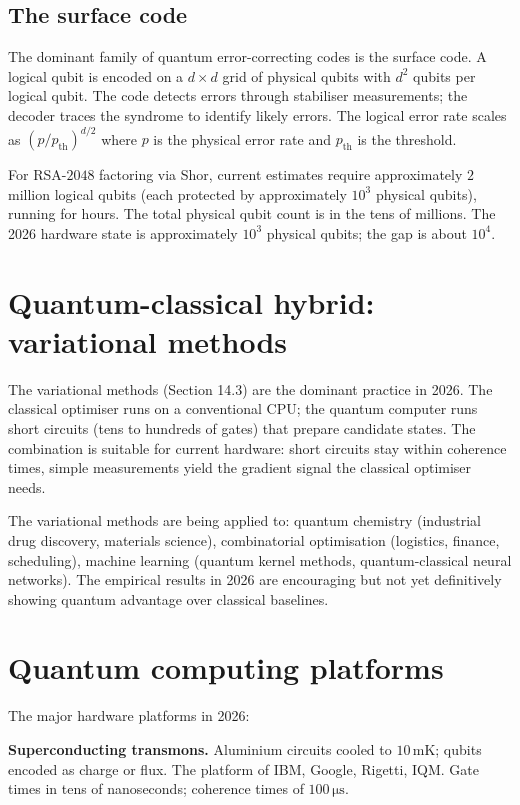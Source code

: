 \subsection{The surface code}

The dominant family of quantum error-correcting codes is the surface code. A logical qubit is encoded on a $d \times d$ grid of physical qubits with $d^2$ qubits per logical qubit. The code detects errors through stabiliser measurements; the decoder traces the syndrome to identify likely errors. The logical error rate scales as $(p/p_{\mathrm{th}})^{d/2}$ where $p$ is the physical error rate and $p_{\mathrm{th}}$ is the threshold.

For RSA-$2048$ factoring via Shor, current estimates require approximately $2$ million logical qubits (each protected by approximately $10^3$ physical qubits), running for hours. The total physical qubit count is in the tens of millions. The 2026 hardware state is approximately $10^3$ physical qubits; the gap is about $10^4$.

\section{Quantum-classical hybrid: variational methods}

The variational methods (Section 14.3) are the dominant practice in 2026. The classical optimiser runs on a conventional CPU; the quantum computer runs short circuits (tens to hundreds of gates) that prepare candidate states. The combination is suitable for current hardware: short circuits stay within coherence times, simple measurements yield the gradient signal the classical optimiser needs.

The variational methods are being applied to: quantum chemistry (industrial drug discovery, materials science), combinatorial optimisation (logistics, finance, scheduling), machine learning (quantum kernel methods, quantum-classical neural networks). The empirical results in 2026 are encouraging but not yet definitively showing quantum advantage over classical baselines.

\section{Quantum computing platforms}

The major hardware platforms in 2026:

\textbf{Superconducting transmons.} Aluminium circuits cooled to $10\,\si{\milli\kelvin}$; qubits encoded as charge or flux. The platform of IBM, Google, Rigetti, IQM. Gate times in tens of nanoseconds; coherence times of $100\,\si{\micro\second}$.

